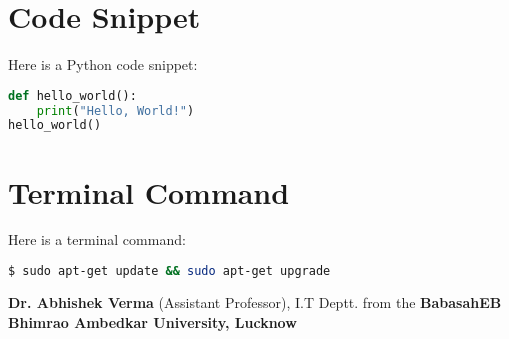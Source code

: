 \documentclass{article}
\begin{document}
\section{Code Snippet}
Here is a Python code snippet:
\begin{lstlisting}[language=Python]
def hello_world():
    print("Hello, World!")
hello_world()
\end{lstlisting}

\section{Terminal Command}
Here is a terminal command:
\begin{lstlisting}[language=bash]
$ sudo apt-get update && sudo apt-get upgrade
\end{lstlisting}
\textbf{Dr. Abhishek Verma} (Assistant Professor), I.T Deptt. from the \textbf{BabasahEB Bhimrao Ambedkar University, Lucknow}
\end{document}
